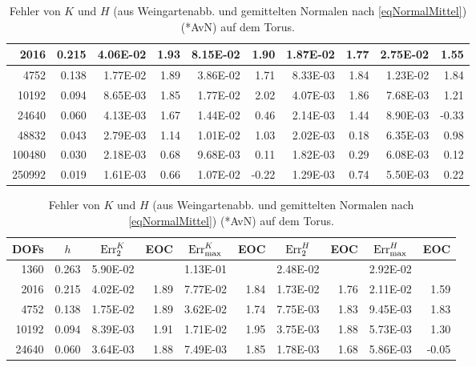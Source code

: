 \begin{beispiel}[Torus]
\begin{table}[htbp]
\begin{tabular}{|r|r|r|r|r|r|r|r|r|r|}
      2016 & 0.215 & 4.06E-02 & 1.93 & 8.15E-02 & 1.90 & 1.87E-02 & 1.77 & 2.75E-02 & 1.55 \\ \hline
      4752 & 0.138 & 1.77E-02 & 1.89 & 3.86E-02 & 1.71 & 8.33E-03 & 1.84 & 1.23E-02 & 1.84 \\ \hline
      10192 & 0.094 & 8.65E-03 & 1.85 & 1.77E-02 & 2.02 & 4.07E-03 & 1.86 & 7.68E-03 & 1.21 \\ \hline
      24640 & 0.060 & 4.13E-03 & 1.67 & 1.44E-02 & 0.46 & 2.14E-03 & 1.44 & 8.90E-03 & -0.33 \\ \hline
      48832 & 0.043 & 2.79E-03 & 1.14 & 1.01E-02 & 1.03 & 2.02E-03 & 0.18 & 6.35E-03 & 0.98 \\ \hline
      100480 & 0.030 & 2.18E-03 & 0.68 & 9.68E-03 & 0.11 & 1.82E-03 & 0.29 & 6.08E-03 & 0.12 \\ \hline
      250992 & 0.019 & 1.61E-03 & 0.66 & 1.07E-02 & -0.22 & 1.29E-03 & 0.74 & 5.50E-03 & 0.22 \\ \hline
      \end{tabular}
      \caption[Gauß-/mittlere Krümmung aus Weingartenabb. auf Torus (AvN)]{Fehler von \( K \) und \( H \) (aus Weingartenabb. und
      gemittelten Normalen nach \eqref{eqNormalMittel}) (*AvN) auf dem Torus.}
      \label{tabWeingartenFehlerTorusAvN}
      \vspace{10pt}
      \begin{tabular}{|r|r|r|r|r|r|r|r|r|r|}
      \hline
      \multicolumn{1}{|c|}{DOFs} & \multicolumn{1}{c|}{\( h \)} & \multicolumn{1}{c|}{\( \text{Err}_{2}^{K} \)} & \multicolumn{1}{c|}{EOC} & 
        \multicolumn{1}{c|}{\( \text{Err}_{\max}^{K} \)} & \multicolumn{1}{c|}{EOC} & \multicolumn{1}{c|}{\( \text{Err}_{2}^{H} \)} &
        \multicolumn{1}{c|}{EOC} & \multicolumn{1}{c|}{\( \text{Err}_{\max}^{H} \)} & \multicolumn{1}{c|}{EOC} \\ \hline
        1360 & 0.263 & 5.90E-02 & \multicolumn{1}{l|}{} & 1.13E-01 & \multicolumn{1}{l|}{} & 2.48E-02 & \multicolumn{1}{l|}{} & 2.92E-02 & \multicolumn{1}{l|}{} \\ \hline
2016 & 0.215 & 4.02E-02 & 1.89 & 7.77E-02 & 1.84 & 1.73E-02 & 1.76 & 2.11E-02 & 1.59 \\ \hline
4752 & 0.138 & 1.75E-02 & 1.89 & 3.62E-02 & 1.74 & 7.75E-03 & 1.83 & 9.45E-03 & 1.83 \\ \hline
10192 & 0.094 & 8.39E-03 & 1.91 & 1.71E-02 & 1.95 & 3.75E-03 & 1.88 & 5.73E-03 & 1.30 \\ \hline
24640 & 0.060 & 3.64E-03 & 1.88 & 7.49E-03 & 1.85 & 1.78E-03 & 1.68 & 5.86E-03 & -0.05 \\ \hline

\end{tabular}
\end{table}
\end{beispiel}
